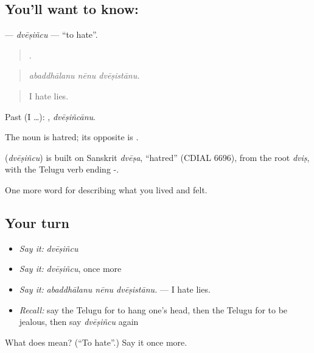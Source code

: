 \subsection*{You'll want to know: }
\textbf{} — \emph{dvēṣiñcu} — \textquotedblleft{}to hate\textquotedblright{}.

\begin{quote}
  .
\end{quote}

\begin{quote}
\emph{abaddhālanu nēnu dvēṣistānu.}
\end{quote}

\begin{quote}
I hate lies.
\end{quote}

Past (I …): , \emph{dvēṣiñcānu}.

The noun  is hatred; its opposite is .

\begin{cousinweb}
\textbf{} (\emph{dvēṣiñcu}) is built on Sanskrit \emph{dvēṣa}, \textquotedblleft{}hatred\textquotedblright{} (CDIAL 6696), from the root \emph{dviṣ}, with the Telugu verb ending -.
\end{cousinweb}

\begin{grammarlens}[title={What you've built}]
One more word for describing what you lived and felt.
\end{grammarlens}

\subsection*{Your turn}
\begin{itemize}
\raggedright
  \item \emph{Say it:} \emph{dvēṣiñcu}
  \item \emph{Say it:} \emph{dvēṣiñcu}, once more
  \item \emph{Say it:} \emph{abaddhālanu nēnu dvēṣistānu.} — I hate lies.
  \item \emph{Recall:} say the Telugu for to hang one's head, then the Telugu for to be jealous, then say \emph{dvēṣiñcu} again
\end{itemize}

\begin{tcolorbox}[breakable,colback=teal!4,colframe=teal!35!black,title={Before you move on}]
What does  mean? (\textquotedblleft{}To hate\textquotedblright{}.) Say it once more.
\end{tcolorbox}
